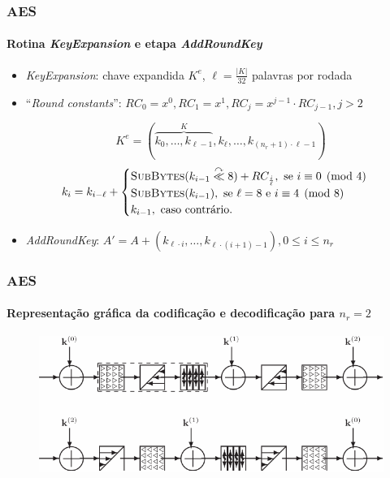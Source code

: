\documentclass[12pt]{beamer}
\newcommand{\length}[1]{\vert{} #1 \vert{}}
\begin{document}
\begin{frame}
  \frametitle{AES}
  \framesubtitle{Rotina \emph{KeyExpansion} e etapa \emph{AddRoundKey}}
  \begin{itemize}
    \item \emph{KeyExpansion}: chave expandida $K^e$, $\ell =
        \frac{\length{K}}{32}$ palavras por rodada
    \item ``\emph{Round constants}'': $RC_0 = x^0, RC_1 = x^1, RC_j = x^{j-1}
        \cdot RC_{j-1}, j > 2$

        \[K^e = (\overbrace{k_0, \dots, k_{\ell - 1}}^{K}, k_{\ell}, \dots,
          k_{(n_r + 1) \cdot \ell - 1})\]
        \begin{equation*}
          k_i = k_{i - \ell} +
          \begin{cases}
            \textsc{SubBytes}(k_{i - 1} \stackrel{\curvearrowright}{\ll} 8) +
              RC_{\frac{i}{\ell}}, \text{ se } i \equiv 0 \pmod{4} \\
            \textsc{SubBytes}(k_{i - 1}),
            \text{ se } \ell = 8 \text { e } i \equiv 4 \pmod{8} \\
            k_{i - 1}, \text{ caso contrário.}
          \end{cases}
        \end{equation*}
    \item \emph{AddRoundKey}: $A' = A + (k_{\ell \cdot i}, \dots, k_{\ell \cdot
        (i + 1) - 1}), 0 \leq i \leq n_r$
  \end{itemize}
\end{frame}

\begin{frame}
  \frametitle{AES}
  \framesubtitle{Representação gráfica da codificação e decodificação para $n_r
    = 2$}
  \begin{figure}
    \centering
    \includegraphics{img/aes_two_rounds.pdf}
  \end{figure}
\end{frame}
\end{document}
